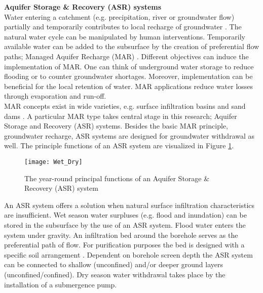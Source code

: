\textbf{Aquifer Storage \& Recovery (ASR) systems}\\
Water entering a catchment (e.g. precipitation, river or groundwater flow) partially and temporarily contributes to local recharge of groundwater \citep{Fitts2012}. The natural water cycle can be manipulated by human interventions. Temporarily available water can be added to the subsurface by the creation of preferential flow paths; Managed Aquifer Recharge (MAR) \citep{Dillon2009}. Different objectives can induce the implementation of MAR. One can think of underground water storage to reduce flooding or to counter groundwater shortages. Moreover, implementation can be beneficial for the local retention of water. MAR applications reduce water losses through evaporation and run-off. \\

MAR concepts exist in wide varieties, e.g. surface infiltration basins and sand dams \citep{Dillon2009}. A particular MAR type takes central stage in this research; Aquifer Storage and Recovery (ASR) systems. Besides the basic MAR principle, groundwater recharge, ASR systems are designed for groundwater withdrawal as well. The principle functions of an ASR system are visualized in Figure \ref{fig:ASR}.

\begin{figure}[h]
 \centering\texttt{[image: Wet\_Dry]}
 \captionsetup{justification=centering}
 \caption{The year-round principal functions of an Aquifer Storage \& Recovery (ASR) system}
 \label{fig:ASR}
\end{figure}

An ASR system offers a solution when natural surface infiltration characteristics are insufficient. Wet season water surpluses (e.g. flood and inundation) can be stored in the subsurface by the use of an ASR system. Flood water enters the system under gravity. An infiltration bed around the borehole serves as the preferential path of flow. For purification purposes the bed is designed with a specific soil arrangement \citep{Owusu2017}. Dependent on borehole screen depth the ASR system can be connected to shallow (unconfined) and/or deeper ground layers (unconfined/confined). Dry season water withdrawal takes place by the installation of a submergence pump. \\

